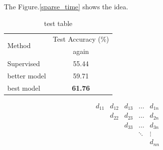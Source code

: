 The Figure.\ref{sparse_time} shows the idea.


\begin{table}[t]
\caption{test table}
\label{test-case}
\begin{center}
\begin{threeparttable}
\begin{tabular}{lc}
\toprule
\multirow{2}{*}{Method} & Test Accuracy (\%) \\
                        & again              \\
\midrule
Supervised              & 55.44              \\
better model            & 59.71              \\
\midrule
best model              & \textbf{61.76}     \\ 
\bottomrule
\end{tabular}
\end{threeparttable}
\end{center}
\vspace{-6mm}
\end{table}

\[
\begin{matrix}
d_{11} & d_{12} & d_{13} & \dots & d_{1n}\\
  & d_{22} & d_{23} & \dots & d_{2n}\\
  &  & d_{33}       &\dots & d_{3n}\\
  &  &              &\ddots & \vdots\\
  &  &              &       & d_{nn}
\end{matrix}
\]

